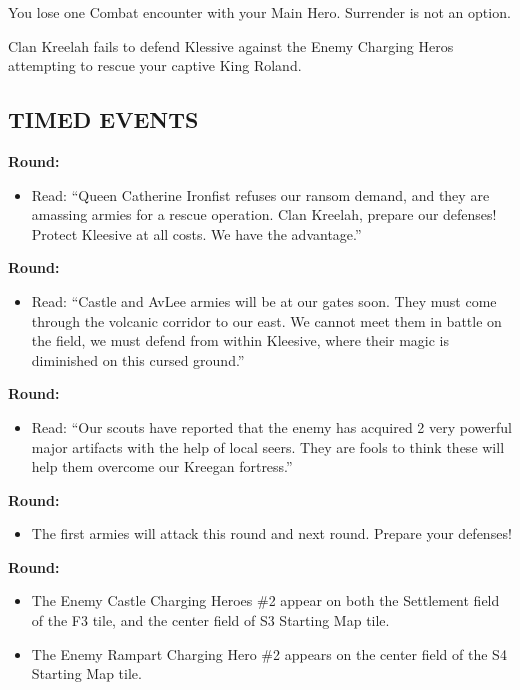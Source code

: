 \begin{multicols*}{2}
You lose one Combat encounter with your Main Hero. Surrender is not an option.

Clan Kreelah fails to defend Klessive against the Enemy Charging Heros attempting to rescue your captive King Roland.

\subsection*{\MakeUppercase{Timed Events}}

\textbf{ Round:}
\begin{itemize}
  \item Read: ``Queen Catherine Ironfist refuses our ransom demand, and they are amassing armies for a rescue
    operation. Clan Kreelah, prepare our defenses! Protect Kleesive at all costs. We have the advantage.''
\end{itemize}

\textbf{ Round:}
\begin{itemize}
  \item Read: ``Castle and AvLee armies will be at our gates soon. They must come through the volcanic corridor
    to our east. We cannot meet them in battle on the field, we must defend from within Kleesive, where
    their magic is diminished on this cursed ground.''
\end{itemize}

\textbf{ Round:}
\begin{itemize}
  \item Read: ``Our scouts have reported that the enemy has acquired 2 very powerful major artifacts with the
    help of local seers. They are fools to think these will help them overcome our Kreegan fortress.”
\end{itemize}

\textbf{ Round:}
\begin{itemize}
  \item The first armies will attack this round and next round. Prepare your defenses!
\end{itemize}

\textbf{ Round:}
\begin{itemize}
  \item The Enemy Castle Charging Heroes \#2 appear on both the Settlement field of the F3 tile, and the center field of S3 Starting Map tile.
  \item The Enemy Rampart Charging Hero \#2 appears on the center field of the S4 Starting Map tile.
\end{itemize}


\end{multicols*}
